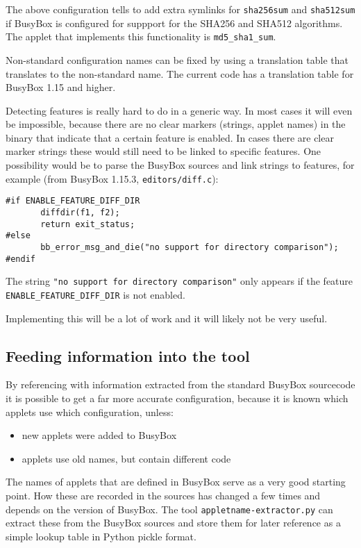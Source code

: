 \documentclass[10pt]{article}
\begin{document}
The above configuration tells to add extra symlinks for \texttt{sha256sum} and
\texttt{sha512sum} if BusyBox is configured for suppport for the SHA256 and
SHA512 algorithms. The applet that implements this functionality is
\texttt{md5\_sha1\_sum}.

Non-standard configuration names can be fixed by using a translation table that
translates to the non-standard name. The current code has a translation table
for BusyBox 1.15 and higher.

Detecting features is really hard to do in a generic way. In most cases it will
even be impossible, because there are no clear markers (strings, applet names)
in the binary that indicate that a certain feature is enabled. In cases there
are clear marker strings these would still need to be linked to specific
features. One possibility would be to parse the BusyBox sources and link
strings to features, for example (from BusyBox 1.15.3,
\texttt{editors/diff.c}):

\begin{verbatim}
#if ENABLE_FEATURE_DIFF_DIR
       diffdir(f1, f2);
       return exit_status;
#else
       bb_error_msg_and_die("no support for directory comparison");
#endif
\end{verbatim}

The string \texttt{"no support for directory comparison"} only appears if the
feature \texttt{ENABLE\_FEATURE\_DIFF\_DIR} is not enabled.

Implementing this will be a lot of work and it will likely not be very useful.

\subsection{Feeding information into the tool}

By referencing with information extracted from the standard BusyBox sourcecode
it is possible to get a far more accurate configuration, because it is known
which applets use which configuration, unless:

\begin{itemize}
\item new applets were added to BusyBox
\item applets use old names, but contain different code
\end{itemize}

The names of applets that are defined in BusyBox serve as a very good starting
point. How these are recorded in the sources has changed a few times and
depends on the version of BusyBox. The tool \texttt{appletname-extractor.py}
can extract these from the BusyBox sources and store them for later reference
as a simple lookup table in Python pickle format.
\end{document}
